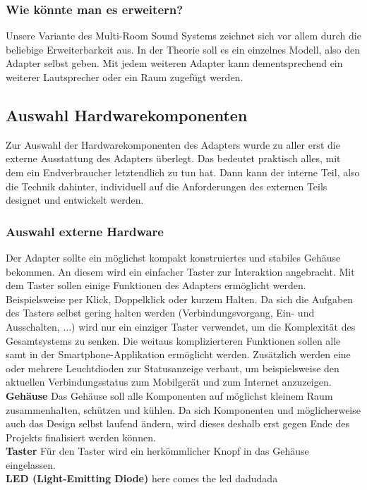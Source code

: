 \documentclass[]{article}
\begin{document}
\subsubsection{Wie könnte man es erweitern?}
Unsere Variante des Multi-Room Sound Systems zeichnet sich vor allem durch die beliebige Erweiterbarkeit aus. In der Theorie soll es ein einzelnes Modell, also den Adapter selbst geben. Mit jedem weiteren Adapter kann dementsprechend ein weiterer Lautsprecher oder ein Raum zugefügt werden.
\subsection{Auswahl Hardwarekomponenten}
Zur Auswahl der Hardwarekomponenten des Adapters wurde zu aller erst die externe Ausstattung des Adapters überlegt. Das bedeutet praktisch alles, mit dem ein Endverbraucher letztendlich zu tun hat. Dann kann der interne Teil, also die Technik dahinter, individuell auf die Anforderungen des externen Teils designet und entwickelt werden.
\subsubsection{Auswahl externe Hardware}
Der Adapter sollte ein möglichst kompakt konstruiertes und stabiles Gehäuse bekommen. An diesem wird ein einfacher Taster zur Interaktion angebracht. Mit dem Taster sollen einige Funktionen des Adapters ermöglicht werden. Beispielsweise per Klick, Doppelklick oder kurzem Halten. Da sich die Aufgaben des Tasters selbst gering halten werden (Verbindungsvorgang, Ein- und Ausschalten, ...) wird nur ein einziger Taster verwendet, um die Komplexität des Gesamtsystems zu senken. Die weitaus komplizierteren Funktionen sollen alle samt in der Smartphone-Applikation ermöglicht werden. Zusätzlich werden eine oder mehrere Leuchtdioden zur Statusanzeige verbaut, um beispielsweise den aktuellen Verbindungsstatus zum Mobilgerät und zum Internet anzuzeigen. \newline \\
\textbf{Gehäuse} \newline
Das Gehäuse soll alle Komponenten auf möglichst kleinem Raum zusammenhalten, schützen und kühlen. Da sich Komponenten und möglicherweise auch das Design selbst laufend ändern, wird dieses deshalb erst gegen Ende des Projekts finalisiert werden können. \newline \\
\textbf{Taster} \newline
Für den Taster wird ein herkömmlicher Knopf in das Gehäuse eingelassen.  \newline \\
\textbf{LED (Light-Emitting Diode)} \newline
here comes the led dadudada
\end{document}
